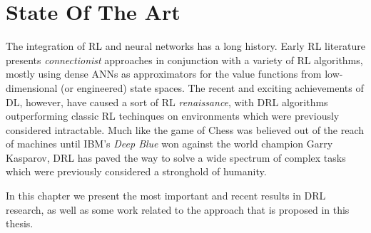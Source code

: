 \chapter{State Of The Art}
\label{chapter3_state_of_the_art}
\thispagestyle{empty}

\vspace{0.5cm}

\noindent The integration of RL and neural networks has a long history. Early 
RL literature \cite{rummery1994line, tesauro1995temporal, bertsekas1995neuro}
presents \textit{connectionist} approaches in conjunction with a variety
of RL algorithms, mostly using dense ANNs as approximators for the value 
functions from low-dimensional (or engineered) state spaces.
The recent and exciting achievements of DL, however, have caused a sort of 
RL \textit{renaissance}, with DRL algorithms outperforming classic RL techinques
on environments which were previously considered intractable. 
Much like the game of Chess was believed out of the reach of machines until 
IBM's \textit{Deep Blue} \cite{campbell2002deep} won against the world champion 
Garry Kasparov, DRL has paved the way to solve a wide spectrum of complex tasks 
which were previously considered a stronghold of humanity. 

In this chapter we present the most important and recent results in DRL research, 
as well as some work related to the approach that is proposed in this thesis.


